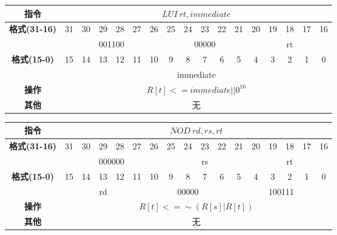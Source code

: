\documentclass[11pt,utf8]{article}
\begin{document}
\begin{center}
\begin{tabular}{|c|c|c|c|c|c|c|c|c|c|c|c|c|c|c|c|c|}
\hline
\textbf{指令} & \multicolumn{16}{c|}{$LUI~rt,immediate$} \\
\hline
\multirow{2}{*}{\textbf{格式(31-16)}} & 31 & 30 & 29 & 28 & 27 & 26 & 25 & 24 & 23 & 22 & 21 & 20 & 19 & 18 & 17 & 16 \\ 
\cline{2-17}
& \multicolumn{6}{c|}{001100} & \multicolumn{5}{c|}{00000} & \multicolumn{5}{c|}{rt}\\
\hline
\multirow{2}{*}{\textbf{格式(15-0)}} & 15 & 14 & 13 & 12 & 11 & 10 & 9 & 8 & 7 & 6 & 5 & 4 & 3 & 2 & 1 & 0 \\
\cline{2-17}
& \multicolumn{16}{c|}{immediate} \\
\hline
\textbf{操作} & \multicolumn{16}{c|}{$R[t]<= immediate || 0^{16}$} \\
\hline
\textbf{其他} & \multicolumn{16}{c|}{无} \\
\hline
\end{tabular}
\end{center}

\begin{center}
\begin{tabular}{|c|c|c|c|c|c|c|c|c|c|c|c|c|c|c|c|c|}
\hline
\textbf{指令} & \multicolumn{16}{c|}{$NOD~rd, rs, rt$} \\
\hline
\multirow{2}{*}{\textbf{格式(31-16)}} & 31 & 30 & 29 & 28 & 27 & 26 & 25 & 24 & 23 & 22 & 21 & 20 & 19 & 18 & 17 & 16 \\ 
\cline{2-17}
& \multicolumn{6}{c|}{000000} & \multicolumn{5}{c|}{rs} & \multicolumn{5}{c|}{rt}\\
\hline
\multirow{2}{*}{\textbf{格式(15-0)}} & 15 & 14 & 13 & 12 & 11 & 10 & 9 & 8 & 7 & 6 & 5 & 4 & 3 & 2 & 1 & 0 \\
\cline{2-17}
& \multicolumn{5}{c|}{rd} & \multicolumn{5}{c|}{00000} & \multicolumn{6}{c|}{100111}\\
\hline
\textbf{操作} & \multicolumn{16}{c|}{$R[t]<=\sim(R[s] | R[t])$} \\
\hline
\textbf{其他} & \multicolumn{16}{c|}{无} \\
\hline
\end{tabular}
\end{center}
\end{document}
